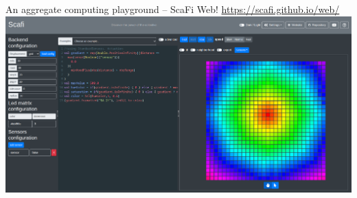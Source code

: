 \documentclass[presentation, 9pt]{beamer}\mode<presentation>{\usetheme{AMSBolognaFC}}
\begin{document}
\begin{frame}{An aggregate computing playground -- ScaFi Web!}
\centering
\url{https://scafi.github.io/web/}
\includegraphics[width=\textwidth]{img/gradient-web.png}
\end{frame}
\end{document}
